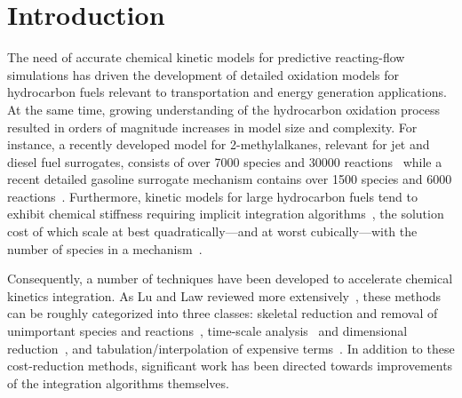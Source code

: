 \documentclass[preprint]{elsarticle}
\begin{document}
\section{Introduction}
\label{sec:Intro}

The need of accurate chemical kinetic models for predictive reacting-flow simulations has driven the development of detailed oxidation models for hydrocarbon fuels relevant to transportation and energy generation applications.
At the same time, growing understanding of the hydrocarbon oxidation process resulted in orders of magnitude increases in model size and complexity.
For instance, a recently developed model for 2-methylalkanes, relevant for jet and diesel fuel surrogates, consists of over 7000 species and 30000 reactions~\cite{Sarathy:2011kx} while a recent detailed gasoline surrogate mechanism contains over 1500 species and 6000 reactions~\cite{Mehl:2011jn}.
Furthermore, kinetic models for large hydrocarbon fuels tend to exhibit chemical stiffness requiring implicit integration algorithms~\cite{Lu:2009gh}, the solution cost of which scale at best quadratically---and at worst cubically---with the number of species in a mechanism~\cite{Lu:2009gh}.

Consequently, a number of techniques have been developed to accelerate chemical kinetics integration.
As Lu and Law reviewed more extensively~\cite{Lu:2009gh}, these methods can be roughly categorized into three classes: skeletal reduction and removal of unimportant species and reactions~\cite{Lu:2005,Pepiot-Desjardins:2008,Niemeyer:2010bt,Niemeyer:2014,Curtis:2015aa}, time-scale analysis~\cite{qssa,pe_approx1,pe_approx2} and dimensional reduction~\cite{Lam:1988wc,Maas:1992aa,Lu:2001ve}, and tabulation\slash interpolation of expensive terms~\cite{Pope:1997wu,Christo1996}.
In addition to these cost-reduction methods, significant work has been directed towards improvements of the integration algorithms themselves.
\end{document}
